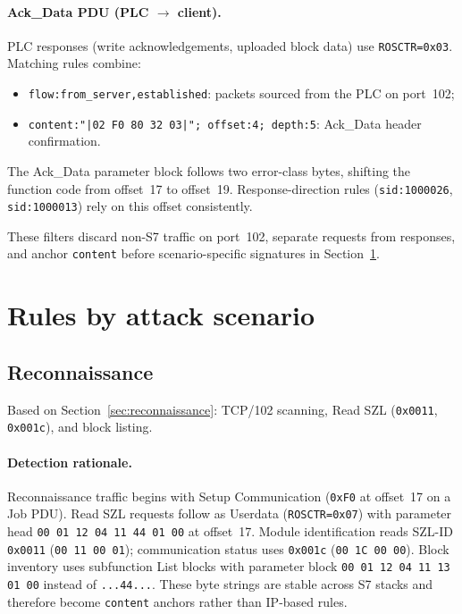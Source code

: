 \documentclass[../main.tex]{subfiles}
\begin{document}
\paragraph{Ack\_Data PDU (PLC $\rightarrow$ client).}
PLC responses (write acknowledgements, uploaded block data) use \texttt{ROSCTR=0x03}. Matching rules combine:
\begin{itemize}
    \item \texttt{flow:from\_server,established}: packets sourced from the PLC on port~102;
    \item \texttt{content:"|02 F0 80 32 03|"; offset:4; depth:5}: Ack\_Data header confirmation.
\end{itemize}
The Ack\_Data parameter block follows two error-class bytes, shifting the function code from offset~17 to offset~19. Response-direction rules (\texttt{sid:1000026}, \texttt{sid:1000013}) rely on this offset consistently.

These filters discard non-S7 traffic on port~102, separate requests from responses, and anchor \texttt{content} before scenario-specific signatures in Section~\ref{sec:rules-by-scenario}.

\section{Rules by attack scenario}
\label{sec:rules-by-scenario}

\subsection{Reconnaissance}
\label{sec:rules-recon}

Based on Section~\ref{sec:reconnaissance}: TCP/102 scanning, Read SZL (\texttt{0x0011}, \texttt{0x001c}), and block listing.

\paragraph{Detection rationale.}
Reconnaissance traffic begins with Setup Communication (\texttt{0xF0} at offset~17 on a Job PDU). Read SZL requests follow as Userdata (\texttt{ROSCTR=0x07}) with parameter head \texttt{00 01 12 04 11 44 01 00} at offset~17. Module identification reads SZL-ID \texttt{0x0011} (\texttt{00 11 00 01}); communication status uses \texttt{0x001c} (\texttt{00 1C 00 00}). Block inventory uses subfunction List blocks with parameter block \texttt{00 01 12 04 11 13 01 00} instead of \texttt{...44...}. These byte strings are stable across S7 stacks and therefore become \texttt{content} anchors rather than IP-based rules.
\end{document}
